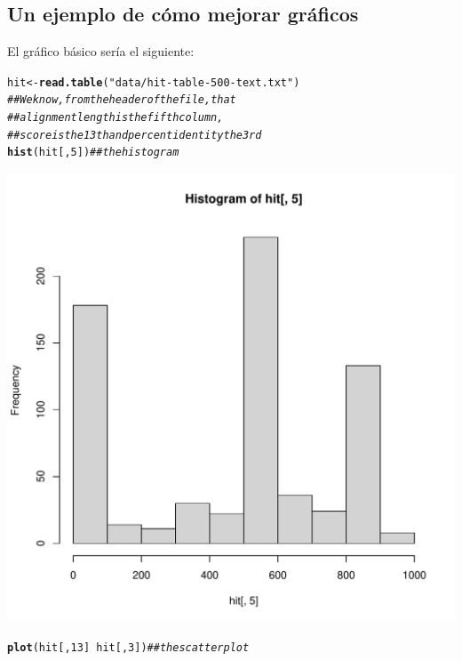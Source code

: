 \documentclass{config/apuntes}\usepackage[]{graphicx}\usepackage[]{xcolor}
\makeatletter
\def\maxwidth{ %
  \ifdim\Gin@nat@width>\linewidth
    \linewidth
  \else
    \Gin@nat@width
  \fi
}
\newcommand{\hlnum}[1]{\textcolor[rgb]{0.686,0.059,0.569}{#1}}%
\newcommand{\hlsng}[1]{\textcolor[rgb]{0.192,0.494,0.8}{#1}}%
\newcommand{\hlcom}[1]{\textcolor[rgb]{0.678,0.584,0.686}{\textit{#1}}}%
\newcommand{\hlopt}[1]{\textcolor[rgb]{0,0,0}{#1}}%
\newcommand{\hldef}[1]{\textcolor[rgb]{0.345,0.345,0.345}{#1}}%
\newcommand{\hlkwb}[1]{\textcolor[rgb]{0.69,0.353,0.396}{#1}}%
\newcommand{\hlkwd}[1]{\textcolor[rgb]{0.737,0.353,0.396}{\textbf{#1}}}%
\newenvironment{kframe}{%
 \def\at@end@of@kframe{}%
 \ifinner\ifhmode%
  \def\at@end@of@kframe{\end{minipage}}%
  \begin{minipage}{\columnwidth}%
 \fi\fi%
 \def\FrameCommand##1{\hskip\@totalleftmargin \hskip-\fboxsep
 \colorbox{shadecolor}{##1}\hskip-\fboxsep
     \hskip-\linewidth \hskip-\@totalleftmargin \hskip\columnwidth}%
 \MakeFramed {\advance\hsize-\width
   \@totalleftmargin\z@ \linewidth\hsize
   \@setminipage}}%
 {\par\unskip\endMakeFramed%
 \at@end@of@kframe}
\newenvironment{knitrout}{}{} %
\makeatother
\begin{document}
\subsection{Un ejemplo de cómo mejorar gráficos}
El gráfico básico sería el siguiente:
\begin{knitrout}
\color{fgcolor}\begin{kframe}
\begin{alltt}
\hldef{hit} \hlkwb{<-} \hlkwd{read.table}\hldef{(}\hlsng{"data/hit-table-500-text.txt"}\hldef{)}
\hlcom{## We know, from the header of the file, that}
\hlcom{## alignment length is the fifth column,}
\hlcom{## score is the 13th and percent identity the 3rd}
\hlkwd{hist}\hldef{(hit[,} \hlnum{5}\hldef{])} \hlcom{## the histogram}
\end{alltt}
\end{kframe}
\includegraphics[width=\maxwidth]{figure/unnamed-chunk-73-1} 
\begin{kframe}\begin{alltt}
\hlkwd{plot}\hldef{(hit[,} \hlnum{13}\hldef{]} \hlopt{~} \hldef{hit[,} \hlnum{3}\hldef{])} \hlcom{## the scatterplot}
\end{alltt}
\end{kframe}

\end{knitrout}
\end{document}
